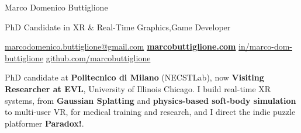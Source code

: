 \documentclass[9pt]{extarticle}
\begin{document}
\fontsize{9.1}{11.5}\selectfont\raggedright
{} 

\begin{minipage}[b]{\dimexpr\textwidth-2cm}
	{\heavy\fontsize{25}{27}\selectfont\color{ink}Marco Domenico Buttiglione}\par\vspace{4pt}
	{\medium\fontsize{10.5}{13}\selectfont\color{accent}PhD Candidate in XR \& Real-Time Graphics\sep Game Developer}\par\vspace{5pt}
	{\fontsize{7.8}{10}\selectfont\color{muted}%
		\href{mailto:marcodomenico.buttiglione@gmail.com}{marcodomenico.buttiglione@gmail.com}\enspace\textperiodcentered\enspace
		\href{https://marcobuttiglione.com}{\textbf{\color{ink}marcobuttiglione.com}}\enspace\textperiodcentered\enspace
		\href{https://www.linkedin.com/in/marco-dom-buttiglione/}{in/marco-dom-buttiglione}\enspace\textperiodcentered\enspace
		\href{https://github.com/marcobuttiglione}{github.com/marcobuttiglione}}
\end{minipage}\hfill
\begin{minipage}[b]{1.6cm}
	\raggedleft\href{https://marcobuttiglione.com}{\color{ink}}
\end{minipage}

\vspace{8pt}
{\fontsize{9.6}{12.4}\selectfont
PhD candidate at \textbf{\color{ink}Politecnico di Milano} (NECSTLab), now \textbf{\color{ink}Visiting Researcher at EVL}, University of Illinois Chicago.
I build real-time XR systems, from \textbf{\color{ink}Gaussian Splatting} and \textbf{\color{ink}physics-based soft-body simulation} to multi-user VR,
for medical training and research, and I direct the indie puzzle platformer \textbf{\color{ink}Paradox!}.\par}
\end{document}
